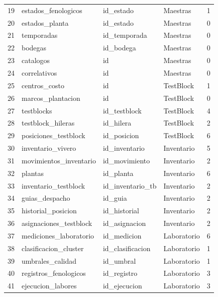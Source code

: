 \documentclass[12pt,a4paper,twoside]{report}
\begin{document}
\begin{longtable}{clllc}
19 & estados\_fenologicos       & id\_estado        & Maestras  & 1 \\
20 & estados\_planta            & id\_estado        & Maestras  & 0 \\
21 & temporadas                 & id\_temporada     & Maestras  & 0 \\
22 & bodegas                    & id\_bodega        & Maestras  & 0 \\
23 & catalogos                  & id               & Maestras  & 0 \\
24 & correlativos               & id               & Maestras  & 0 \\
25 & centros\_costo             & id               & TestBlock & 1 \\
26 & marcos\_plantacion         & id               & TestBlock & 0 \\
27 & testblocks                 & id\_testblock     & TestBlock & 4 \\
28 & testblock\_hileras         & id\_hilera        & TestBlock & 2 \\
29 & posiciones\_testblock      & id\_posicion      & TestBlock & 6 \\
30 & inventario\_vivero         & id\_inventario    & Inventario & 5 \\
31 & movimientos\_inventario    & id\_movimiento    & Inventario & 2 \\
32 & plantas                    & id\_planta        & Inventario & 6 \\
33 & inventario\_testblock      & id\_inventario\_tb & Inventario & 2 \\
34 & guias\_despacho            & id\_guia          & Inventario & 2 \\
35 & historial\_posicion        & id\_historial     & Inventario & 2 \\
36 & asignaciones\_testblock    & id\_asignacion    & Inventario & 2 \\
37 & mediciones\_laboratorio    & id\_medicion      & Laboratorio & 6 \\
38 & clasificacion\_cluster     & id\_clasificacion & Laboratorio & 1 \\
39 & umbrales\_calidad          & id\_umbral        & Laboratorio & 1 \\
40 & registros\_fenologicos     & id\_registro      & Laboratorio & 3 \\
41 & ejecucion\_labores         & id\_ejecucion     & Laboratorio & 3 \\

\end{longtable}
\end{document}
